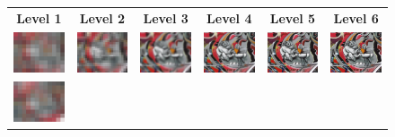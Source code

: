\begin{landscape}
\begin{figure}
    \setlength\tabcolsep{2.5pt}
    \begin{center}
        \begin{tabular}{c c c c c c}
        \textbf{Level 1} & \textbf{Level 2} & \textbf{Level 3} & \textbf{Level 4} & \textbf{Level 5} & \textbf{Level 6} \\
        \includegraphics[width=2.2cm]{main/chapter03/data/homography/img_src_1.jpg} &
        \includegraphics[width=2.2cm]{main/chapter03/data/homography/img_src_2.jpg} &
        \includegraphics[width=2.2cm]{main/chapter03/data/homography/img_src_3.jpg} &
        \includegraphics[width=2.2cm]{main/chapter03/data/homography/img_src_4.jpg} &
        \includegraphics[width=2.2cm]{main/chapter03/data/homography/img_src_5.jpg} &
        \includegraphics[width=2.2cm]{main/chapter03/data/homography/img_src_7.jpg} \\
        \includegraphics[width=2.2cm]{main/chapter03/data/homography/img_dst_1.jpg} &

\end{tabular}
\end{center}
\end{figure}
\end{landscape}
